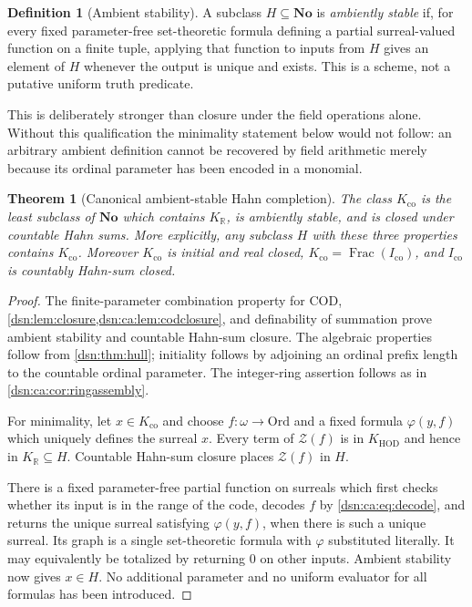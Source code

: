 \documentclass[11pt,a4paper]{article}
\numberwithin{equation}{section}
\newtheorem{theorem}{Theorem}[section]
\theoremstyle{definition}
\newtheorem{definition}[definition]{Definition}
\theoremstyle{remark}
\newcommand{\No}{\mathbf{No}}
\newcommand{\Ord}{\mathrm{Ord}}
\newcommand{\HOD}{\mathrm{HOD}}
\newcommand{\R}{\mathbb R}
\newcommand{\Frac}{\operatorname{Frac}}
\newcommand{\KH}{K_{\HOD}}
\newcommand{\COD}{\mathrm{COD}}
\newcommand{\KR}{K_{\R}}
\newcommand{\Kco}{K_{\mathrm{co}}}
\newcommand{\Ico}{I_{\mathrm{co}}}
\newcommand{\Zc}{\mathcal Z}
\begin{document}
\begin{definition}[Ambient stability]\label{dsn:ca:def:stable}
A subclass $H\subseteq\No$ is \emph{ambiently stable} if, for every
fixed parameter-free set-theoretic formula defining a partial
surreal-valued function on a finite tuple, applying that function to
inputs from $H$ gives an element of $H$ whenever the output is unique
and exists. This is a scheme, not a putative uniform truth predicate.
\end{definition}

This is deliberately stronger than closure under the field operations
alone. Without this qualification the minimality statement below would
not follow: an arbitrary ambient definition cannot be recovered by
field arithmetic merely because its ordinal parameter has been encoded
in a monomial.

\begin{theorem}[Canonical ambient-stable Hahn completion]\label{dsn:ca:thm:completion}
The class $\Kco$ is the least subclass of $\No$ which contains $\KR$,
is ambiently stable, and is closed under countable Hahn sums. More
explicitly, any subclass $H$ with these three properties contains
$\Kco$. Moreover $\Kco$ is initial and real closed,
$\Kco=\Frac(\Ico)$, and $\Ico$ is countably Hahn-sum closed.
\end{theorem}
\begin{proof}
The finite-parameter combination property for $\COD$,
\cref{dsn:lem:closure,dsn:ca:lem:codclosure}, and definability of summation prove
ambient stability and countable Hahn-sum closure. The algebraic
properties follow from \cref{dsn:thm:hull}; initiality follows by
adjoining an ordinal prefix length to the countable ordinal parameter.
The integer-ring assertion follows as in \cref{dsn:ca:cor:ringassembly}.

For minimality, let $x\in\Kco$ and choose
$f:\omega\to\Ord$ and a fixed formula $\varphi(y,f)$ which uniquely
defines the surreal $x$. Every term of $\Zc(f)$ is in $\KH$ and
hence in $\KR\subseteq H$. Countable Hahn-sum closure places
$\Zc(f)$ in $H$.

There is a fixed parameter-free partial function on surreals which
first checks whether its input is in the range of the code, decodes
$f$ by \eqref{dsn:ca:eq:decode}, and returns the unique surreal satisfying
$\varphi(y,f)$, when there is such a unique surreal. Its graph is a
single set-theoretic formula with $\varphi$ substituted literally.
It may equivalently be totalized by returning $0$ on other inputs.
Ambient stability now gives $x\in H$. No additional parameter and no
uniform evaluator for all formulas has been introduced.
\end{proof}
\end{document}
